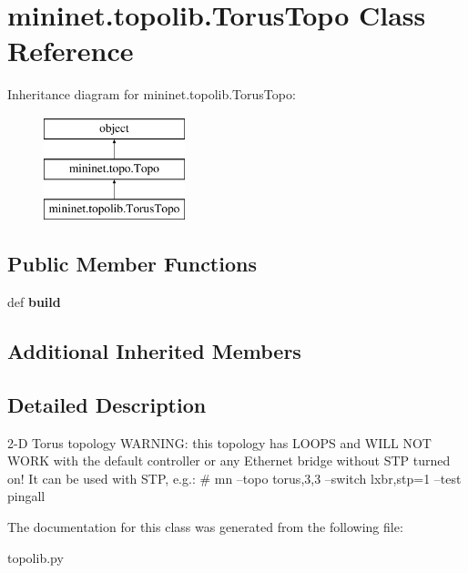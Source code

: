 \hypertarget{classmininet_1_1topolib_1_1TorusTopo}{\section{mininet.\-topolib.\-Torus\-Topo Class Reference}
\label{classmininet_1_1topolib_1_1TorusTopo}
}
Inheritance diagram for mininet.\-topolib.\-Torus\-Topo\-:\begin{figure}[H]
\begin{center}
\leavevmode
\includegraphics[height=3.000000cm]{classmininet_1_1topolib_1_1TorusTopo}
\end{center}
\end{figure}
\subsection*{Public Member Functions}
\begin{DoxyCompactItemize}
\item 
\hypertarget{classmininet_1_1topolib_1_1TorusTopo_a7cd10b420d90c4892d6de451254d795b}{def {\bfseries build}}\label{classmininet_1_1topolib_1_1TorusTopo_a7cd10b420d90c4892d6de451254d795b}

\end{DoxyCompactItemize}
\subsection*{Additional Inherited Members}


\subsection{Detailed Description}
\begin{DoxyVerb}2-D Torus topology
   WARNING: this topology has LOOPS and WILL NOT WORK
   with the default controller or any Ethernet bridge
   without STP turned on! It can be used with STP, e.g.:
   # mn --topo torus,3,3 --switch lxbr,stp=1 --test pingall\end{DoxyVerb}
 

The documentation for this class was generated from the following file\-:\begin{DoxyCompactItemize}
\item 
topolib.\-py\end{DoxyCompactItemize}
